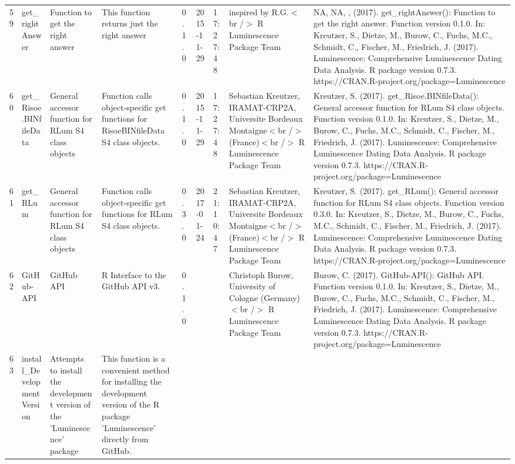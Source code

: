 \begin{table}[ht]
\begin{tabular}{rllllllll}
 \\ 
  59 & get\_rightAnswer & Function to get the right answer & This function returns just the right answer & 0.1.0 & 2015-11-29 & 17:27:48
 & inspired by R.G.$<$br /$>$  R Luminescence Package Team & NA, NA, ,  (2017). get\_rightAnswer(): Function to get the right answer. Function version 0.1.0. In: Kreutzer, S., Dietze, M., Burow, C., Fuchs, M.C., Schmidt, C., Fischer, M., Friedrich, J. (2017). Luminescence: Comprehensive Luminescence Dating Data Analysis. R package version 0.7.3. https://CRAN.R-project.org/package=Luminescence
 \\ 
  60 & get\_Risoe.BINfileData & General accessor function for RLum S4 class objects & Function calls object-specific get functions for RisoeBINfileData S4 class objects. & 0.1.0 & 2015-11-29 & 17:27:48
 & Sebastian Kreutzer, IRAMAT-CRP2A, Universite Bordeaux Montaigne$<$br /$>$ (France)$<$br /$>$  R Luminescence Package Team & Kreutzer, S. (2017). get\_Risoe.BINfileData(): General accessor function for RLum S4 class objects. Function version 0.1.0. In: Kreutzer, S., Dietze, M., Burow, C., Fuchs, M.C., Schmidt, C., Fischer, M., Friedrich, J. (2017). Luminescence: Comprehensive Luminescence Dating Data Analysis. R package version 0.7.3. https://CRAN.R-project.org/package=Luminescence
 \\ 
  61 & get\_RLum & General accessor function for RLum S4 class objects & Function calls object-specific get functions for RLum S4 class objects. & 0.3.0 & 2017-01-24 & 21:10:47
 & Sebastian Kreutzer, IRAMAT-CRP2A, Universite Bordeaux Montaigne$<$br /$>$ (France)$<$br /$>$  R Luminescence Package Team & Kreutzer, S. (2017). get\_RLum(): General accessor function for RLum S4 class objects. Function version 0.3.0. In: Kreutzer, S., Dietze, M., Burow, C., Fuchs, M.C., Schmidt, C., Fischer, M., Friedrich, J. (2017). Luminescence: Comprehensive Luminescence Dating Data Analysis. R package version 0.7.3. https://CRAN.R-project.org/package=Luminescence
 \\ 
  62 & GitHub-API & GitHub API & R Interface to the GitHub API v3. & 0.1.0
 &  &  & Christoph Burow, University of Cologne (Germany)$<$br /$>$  R Luminescence Package Team & Burow, C. (2017). GitHub-API(): GitHub API. Function version 0.1.0. In: Kreutzer, S., Dietze, M., Burow, C., Fuchs, M.C., Schmidt, C., Fischer, M., Friedrich, J. (2017). Luminescence: Comprehensive Luminescence Dating Data Analysis. R package version 0.7.3. https://CRAN.R-project.org/package=Luminescence
 \\ 
  63 & install\_DevelopmentVersion & Attempts to install the development version of the 'Luminescence' package & This function is a convenient method for installing the development version of the R package 'Luminescence' directly from GitHub. &  &  &  &  &  \\ 

\end{tabular}
\end{table}
